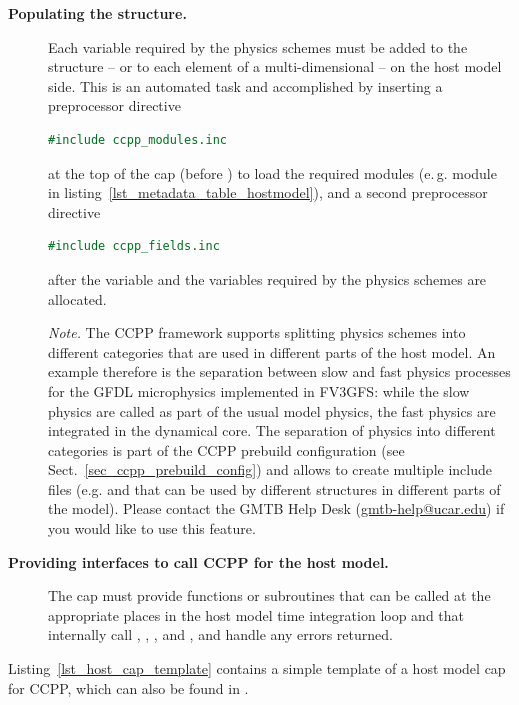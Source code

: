\begin{description}
\item[\textbf{Populating the  structure.}] Each variable required by the physics schemes must be added to the  structure -- or to each element of a multi-dimensional  -- on the host model side. This is an automated task and accomplished by inserting a preprocessor directive
\begin{lstlisting}[language=Fortran]
#include ccpp_modules.inc
\end{lstlisting}
at the top of the cap (before ) to load the required modules (e.\,g. module  in listing~\ref{lst_metadata_table_hostmodel}), and a second preprocessor directive
\begin{lstlisting}[language=Fortran]
#include ccpp_fields.inc
\end{lstlisting}
after the  variable and the variables required by the physics schemes are allocated.

\emph{Note.} The CCPP framework supports splitting physics schemes into different categories that are used in different parts of the host model. An example therefore is the separation between slow and fast physics processes for the GFDL microphysics implemented in FV3GFS: while the slow physics are called as part of the usual model physics, the fast physics are integrated in the dynamical core. The separation of physics into different categories is part of the CCPP prebuild configuration (see Sect.~\ref{sec_ccpp_prebuild_config}) and allows to create multiple include files (e.g.  and  that can be used by different  structures in different parts of the model). Please contact the GMTB Help Desk (\url{gmtb-help@ucar.edu}) if you would like to use this feature.
\item[\textbf{Providing interfaces to call CCPP for the host model.}] The cap must provide functions or subroutines that can be called at the appropriate places in the host model time integration loop and that internally call , , ,  and , and handle any errors returned.
\end{description}
Listing~\ref{lst_host_cap_template} contains a simple template of a host model cap for CCPP, which can also be found in .
\begin{figure}

\end{figure}\clearpage
